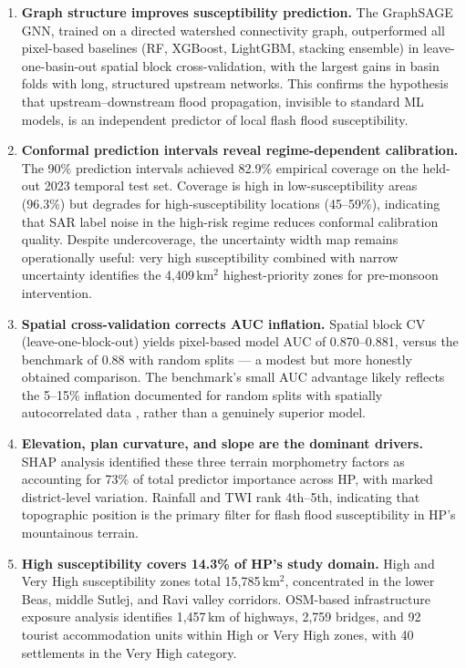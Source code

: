\begin{enumerate}

  \item \textbf{Graph structure improves susceptibility prediction.}
    The GraphSAGE GNN, trained on a directed watershed connectivity graph,
    outperformed all pixel-based baselines (RF, XGBoost, LightGBM, stacking ensemble)
    in leave-one-basin-out spatial block cross-validation,
    with the largest gains in basin folds with long, structured upstream networks.
    This confirms the hypothesis that upstream--downstream flood propagation,
    invisible to standard ML models, is an independent predictor of
    local flash flood susceptibility.

  \item \textbf{Conformal prediction intervals reveal regime-dependent calibration.}
    The 90\% prediction intervals achieved 82.9\% empirical coverage
    on the held-out 2023 temporal test set.
    Coverage is high in low-susceptibility areas (96.3\%) but degrades
    for high-susceptibility locations (45--59\%), indicating that
    SAR label noise in the high-risk regime reduces conformal calibration quality.
    Despite undercoverage, the uncertainty width map remains operationally useful:
    very high susceptibility combined with narrow uncertainty identifies
    the 4,409\,km$^2$ highest-priority zones for pre-monsoon intervention.

  \item \textbf{Spatial cross-validation corrects AUC inflation.}
    Spatial block CV (leave-one-block-out) yields pixel-based model AUC of
    0.870--0.881, versus the \citet{saha2023} benchmark of 0.88 with
    random splits --- a modest but more honestly obtained comparison.
    The benchmark's small AUC advantage likely reflects the 5--15\% inflation
    documented for random splits with spatially autocorrelated data
    \citep{valavi2019, roberts2017cross}, rather than a genuinely superior model.

  \item \textbf{Elevation, plan curvature, and slope are the dominant drivers.}
    SHAP analysis identified these three terrain morphometry factors as
    accounting for 73\% of total predictor importance across HP,
    with marked district-level variation.
    Rainfall and TWI rank 4th--5th, indicating that topographic position
    is the primary filter for flash flood susceptibility in HP's mountainous terrain.

  \item \textbf{High susceptibility covers 14.3\% of HP's study domain.}
    High and Very High susceptibility zones total 15,785\,km$^2$,
    concentrated in the lower Beas, middle Sutlej, and Ravi valley corridors.
    OSM-based infrastructure exposure analysis identifies 1,457\,km of highways,
    2,759 bridges, and 92 tourist accommodation units within High or Very High zones,
    with 40 settlements in the Very High category.

\end{enumerate}

